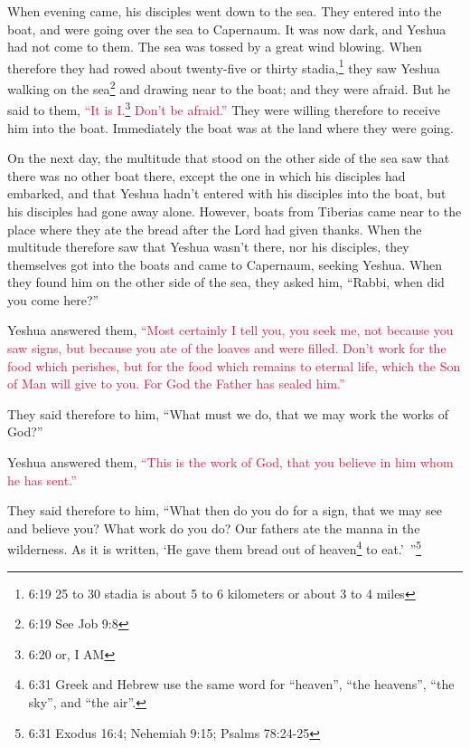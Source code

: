 \myverse{}When evening came, his disciples went down to the sea.
\myverse{}They entered into the boat, and were going over the sea to Capernaum. It was
now dark, and Yeshua had not come to them.
\myverse{}The sea was tossed by a great wind blowing.
\myverse{}When therefore they had rowed about twenty-five or thirty stadia,\footnote{6:19 25 to 30 stadia is about 5 to 6 kilometers or about 3 to 4 miles} they saw Yeshua walking
on the sea\footnote{6:19 See
	Job 9:8} and drawing near to the boat; and they were afraid.
\myverse{}But he said to them,
\textcolor{crimson}{“It is I.}\footnote{6:20 or, I AM}
\textcolor{crimson}{Don’t be afraid.”}
\myverse{}They were willing therefore to receive him into the boat. Immediately the
boat was at the land where they were going.

\myverse{}On the next day, the multitude that stood on the other side of
the sea saw that there was no other boat there, except the one in which his disciples had embarked, and
that Yeshua hadn’t entered with his disciples into the boat, but his disciples had gone away alone.
\myverse{}However, boats from Tiberias came near to the place where they ate the bread
after the Lord had given thanks.
\myverse{}When the multitude therefore saw that Yeshua wasn’t there, nor his disciples,
they themselves got into the boats and came to Capernaum, seeking Yeshua.
\myverse{}When they found him on the other side of the sea, they asked him, “Rabbi,
when did you come here?”

\myverse{}Yeshua answered them,
\textcolor{crimson}{“Most certainly I tell you, you seek me, not because you saw signs, but because you ate of the loaves
	and were filled.
}
\myverse{}\textcolor{crimson}{Don’t work for the food which perishes, but for the food which remains
	to eternal life, which the Son of Man will give to you. For God the Father has sealed him.”}

\myverse{}They said therefore to him, “What must we do, that we may work
the works of God?”

\myverse{}Yeshua answered them,
\textcolor{crimson}{“This is the work of God, that you believe in him whom he has sent.”}

\myverse{}They said therefore to him, “What then do you do for a sign,
that we may see and believe you? What work do you do?
\myverse{}Our fathers ate the manna in the wilderness. As it is written, ‘He gave them
bread out of heaven\footnote{6:31 Greek and Hebrew use the same word for “heaven”, “the heavens”, “the sky”, and “the air”.}
to eat.’ ”\footnote{6:31 Exodus 16:4;
	Nehemiah 9:15;
	Psalms 78:24-25}

